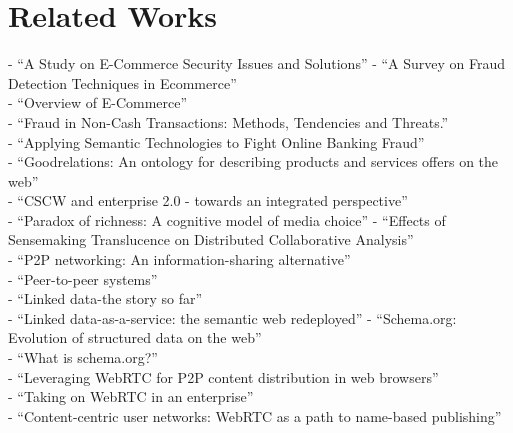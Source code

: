 
\chapter{Related Works}
\label{cha:related_works}
- ``A Study on E-Commerce Security Issues and Solutions'' \citep{sen2015study}
- ``A Survey on Fraud Detection Techniques in Ecommerce'' \citep{rana2015survey} \\
- ``Overview of E-Commerce'' \citep{ankhule2015overview} \\
- ``Fraud in Non-Cash Transactions: Methods, Tendencies and Threats.'' \citep{sobko2014fraud} \\
- ``Applying Semantic Technologies to Fight Online Banking Fraud'' \citep{carvalhoapplying} \\
- ``Goodrelations: An ontology for describing products and services offers on the web'' \citep{hepp2008goodrelations} \\
- ``CSCW and enterprise 2.0 - towards an integrated perspective'' \citep{Koch2008} \\
- ``Paradox of richness: A cognitive model of media choice'' \citep{robert2005paradox}
- ``Effects of Sensemaking Translucence on Distributed Collaborative Analysis'' \citep{goyaleffects} \\
- ``P2P networking: An information-sharing alternative'' \citep{parameswaran2001p2p} \\
- ``Peer-to-peer systems'' \citep{rodrigues2010peer} \\
- ``Linked data-the story so far'' \citep{bizer2009linked} \\
- ``Linked data-as-a-service: the semantic web redeployed'' \citep{rietveld2015linked}
- ``Schema.org: Evolution of structured data on the web'' \citep{guha2016schema} \\
- ``What is schema.org?'' \citep{barker2014schema} \\
- ``Leveraging WebRTC for P2P content distribution in web browsers'' \citep{vogt2013leveraging} \\
- ``Taking on WebRTC in an enterprise'' \citep{vogt2013leveraging} \\
- ``Content-centric user networks: WebRTC as a path to name-based publishing'' \citep{vogt2013content}

